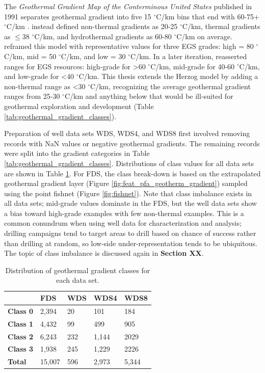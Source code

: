 The \textit{Geothermal Gradient Map of the Conterminous United States} published in 1991 separates geothermal gradient into five 15 $^\circ$C/km bins that end with 60-75+ $^\circ$C/km \citep{lanl_geothermal_1991}. \citet{armstead_heat_1987} instead defined non-thermal gradients as 20-25 $^\circ$C/km, thermal gradients as $\leq$38 $^\circ$C/km, and hydrothermal gradients as 60-80 $^\circ$C/km on average. \citet{tester_economic_1990} reframed this model with representative values for three EGS grades: high = 80 $^\circ$C/km, mid = 50 $^\circ$C/km, and low = 30 $^\circ$C/km. In a later iteration, \citet{herzog_economic_1997} reasserted ranges for EGS resources: high-grade for >60 $^\circ$C/km, mid-grade for 40-60 $^\circ$C/km, and low-grade for <40 $^\circ$C/km. This thesis extends the Herzog model by adding a non-thermal range as <30 $^\circ$C/km, recognizing the average geothermal gradient ranges from 25-30 $^\circ$C/km and anything below that would be ill-suited for geothermal exploration and development (Table \ref{tab:geothermal_gradient_classes}).

Preparation of well data sets WDS, WDS4, and WDS8 first involved removing records with NaN values or negative geothermal gradients. The remaining records were split into the gradient categories in Table \ref{tab:geothermal_gradient_classes}. Distributions of class values for all data sets are shown in Table \ref{tab:data_set_class_count}. For FDS, the class break-down is based on the extrapolated \citet{bielicki_hydrogeolgic_2015} geothermal gradient layer (Figure \ref{fig:feat_pfa_geotherm_gradient}) sampled using the point fishnet (Figure \ref{fig:fishnet}). Note that class imbalance exists in all data sets; mid-grade values dominate in the FDS, but the well data sets show a bias toward high-grade examples with few non-thermal examples. This is a common conundrum when using well data for characterization and analysis; drilling campaigns tend to target areas to drill based on chance of success rather than drilling at random, so low-side under-representation tends to be ubiquitous. The topic of class imbalance is discussed again in \textbf{Section XX}.  

\begin{table}[htp]
\centering
\begin{tabular}{|l|l|l|l|l|}
\hline
\textbf{}        & \textbf{FDS} & \textbf{WDS} & \textbf{WDS4} & \textbf{WDS8} \\ \hline
\textbf{Class 0} & 2,394 & 20 & 101 & 184 \\ \hline
\textbf{Class 1} & 4,432 & 99 & 499 & 905 \\ \hline
\textbf{Class 2} & 6,243 & 232 & 1,144 & 2029 \\ \hline
\textbf{Class 3} & 1,938 & 245 & 1,229 & 2226 \\ \hline
\textbf{Total}   & 15,007 & 596 & 2,973 & 5,344 \\ \hline
\end{tabular}
\caption[Data set class distribution]{Distribution of geothermal gradient classes for each data set.}
\label{tab:data_set_class_count}
\end{table}

